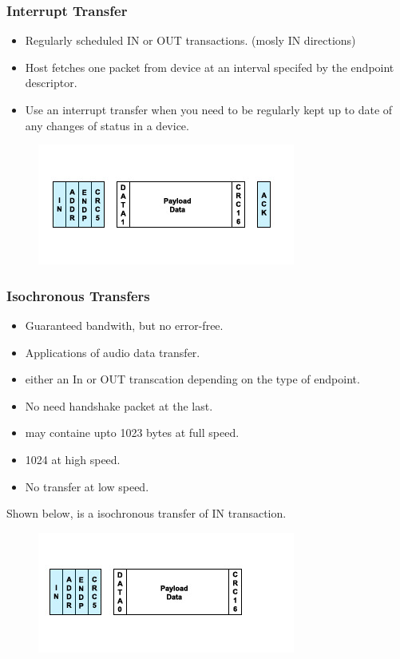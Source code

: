 \documentclass{article}
\begin{document}
\subsubsection{Interrupt Transfer}
\begin{itemize}
    \item Regularly scheduled IN or OUT transactions. (mosly IN directions)
    \item Host fetches one packet from device at an interval specifed by the endpoint descriptor.
    \item Use an interrupt transfer when you need to be regularly kept up to date of any changes of status in a device.
\end{itemize}

\begin{figure}[H]
    \centering
    \includegraphics[]{DocuResources/InterruptINTransfer.jpg}
\end{figure}

\subsubsection{Isochronous Transfers}
\begin{itemize}
    \item Guaranteed bandwith, but no error-free.
    \item Applications of audio data transfer.
    \item either an In or OUT transcation depending on the type of endpoint.
    \item No need handshake packet at the last.
    \item may containe upto 1023 bytes at full speed.
    \item 1024 at high speed.
    \item No transfer at low speed.
\end{itemize}

Shown below, is a isochronous transfer of IN transaction.
\begin{figure}[H]
    \centering
    \includegraphics[]{DocuResources/IsochrnousINTransfer.jpg}
\end{figure}
\end{document}
